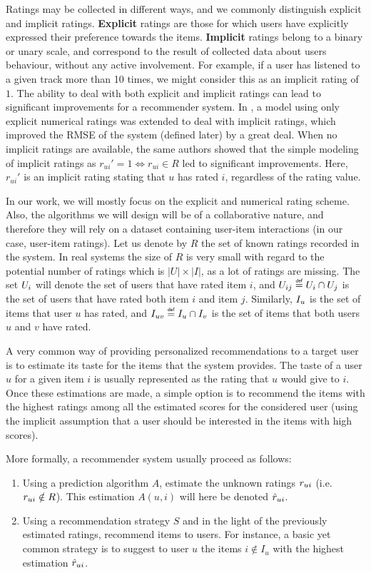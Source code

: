 Ratings may be collected in different ways, and we commonly distinguish explicit and
implicit ratings. \textbf{Explicit} ratings are those for which users have
explicitly expressed their preference towards the items. \textbf{Implicit}
ratings belong to a binary or unary scale, and correspond to the result of
collected data about users behaviour, without any active involvement. For
example, if a user has listened to a given track more than 10 times, we might
consider this as an implicit rating of $1$. The ability to deal with both
explicit and implicit ratings can lead to significant improvements for a
recommender system. In \cite{KorSillRECSYS11}, a model using only explicit
numerical ratings was extended to deal with implicit ratings, which improved
the RMSE of the system (defined later) by a great deal. When no implicit
ratings are available, the same authors showed that the simple modeling of
implicit ratings as $r_{ui}' = 1 \iff r_{ui} \in R$ led to significant
improvements. Here, $r_{ui}'$ is an implicit rating stating that $u$ has rated
$i$, regardless of the rating value.

In our work, we will mostly focus on the explicit and numerical rating scheme.
Also, the algorithms we will design will be of a collaborative nature, and
therefore they will rely on a dataset containing user-item interactions (in our
case, user-item ratings).
Let us denote by $R$ the set of known ratings recorded in the system. In real
systems the size of $R$ is very small with regard to the potential number of
ratings which is $|U| \times |I|$, as a lot of ratings are missing. The set
$U_i$ will denote the set of users that have rated item $i$, and $\Uij \eqdef
U_i \cap U_j$ is the set of users that have rated both item $i$ and item $j$.
Similarly, $I_u$ is the set of items that user $u$ has rated, and $\Iuv \eqdef
I_u \cap I_v$ is the set of items that both users $u$ and $v$ have rated.

A very common way of providing personalized recommendations to a target user is
to estimate its taste for the items that the system provides. The taste of a
user $u$ for a given item $i$ is usually represented as the rating that $u$
would give to $i$.  Once these estimations are made, a simple option is to
recommend the items with the highest ratings among all the estimated scores for
the considered user (using the implicit assumption that a user should be
interested in the items with high scores).

More formally, a recommender system usually proceed as follows:
\begin{enumerate}
\item Using a prediction algorithm $A$, estimate the unknown ratings $r_{ui}$
  (i.e. $r_{ui} \notin R$). This estimation $A(u, i)$ will here be denoted
    $\hat{r}_{ui}$.
\item Using a recommendation strategy $S$ and in the light of the previously
  estimated ratings, recommend items to users. For instance, a basic yet common
    strategy is to suggest to user $u$ the items $i \notin I_u$ with the
    highest estimation $\hat{r}_{ui}$.
\end{enumerate}


